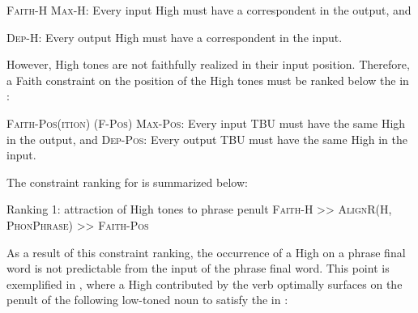 \documentclass[output=paper,newtxmath,modfonts,nonflat,draft]{langsci/langscibook}
\begin{document}
\ea\label{ex:downing:15}\textsc{Faith-H}
\ea\label{ex:downing:15a} \textsc{Max-H}: Every input High  must have a correspondent in the output, and

\ex\label{ex:downing:15b}\textsc{Dep-H}: Every output High  must have a correspondent in the input.
\z
\z

However, High tones are not faithfully realized in their input position. Therefore, a Faith constraint on the position of the High tones must be ranked below the  in :

\ea\label{ex:downing:16}  \textsc{Faith-Pos(ition) (F-Pos)}
\sn
\ea\label{ex:downing:16a} \textsc{Max-Pos}: Every input TBU must have the same High  in the output, and
\ex\label{ex:downing:16a}\textsc{Dep-Pos}: Every output TBU must have the same High  in the input.
\z
\z

The constraint ranking for  is summarized below:


\ea\label{ex:downing:17}  Ranking 1:  attraction of High tones to phrase penult
\sn
\textsc{Faith-H >> AlignR(H, PhonPhrase}) \textsc{>> Faith-Pos}
\z


As a result of this constraint ranking, the occurrence of a High  on a phrase final word is not predictable from the input  of the phrase final word. This point is exemplified in , where a High  contributed by the verb optimally surfaces on the penult of the following low-toned noun to satisfy the  in :

\end{document}
